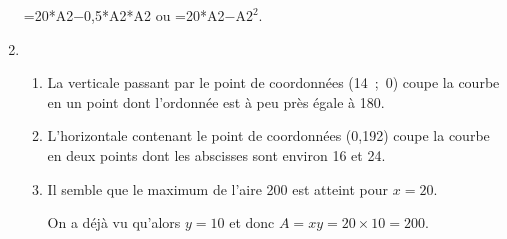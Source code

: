\begin{enumerate}
=20*A2$-$0,5*A2*A2 ou =20*A2$-$A$2^2$.
\item %

%

	\begin{enumerate}
		\item %
La verticale passant par le point de coordonnées (14~;~0) coupe la courbe en un point dont l'ordonnée est à peu près égale à 180. 
		\item %
L'horizontale contenant le point de coordonnées (0,192) coupe la courbe en deux points dont les abscisses sont environ 16 et 24.
		\item %
Il semble que le maximum de l'aire 200 est atteint pour $x = 20$.

On a déjà vu qu'alors $y = 10$ et donc $A = xy = 20 \times 10 = 200$.
	\end{enumerate} 
\end{enumerate}

\bigskip

